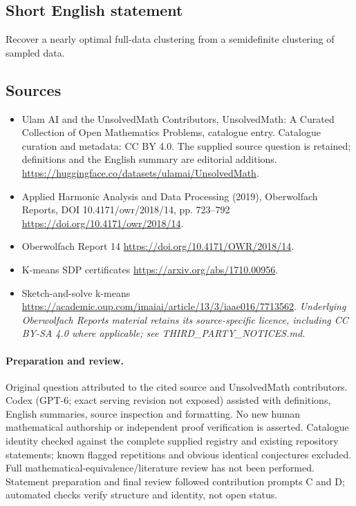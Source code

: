 \documentclass[11pt]{article}
\begin{document}
\subsection{Short English statement}
Recover a nearly optimal full-data clustering from a semidefinite clustering of sampled data.
\subsection{Sources}
\begin{itemize}
\item[\hypertarget{source:statement:1}{S1}] Ulam AI and the UnsolvedMath Contributors, UnsolvedMath: A Curated Collection of Open Mathematics Problems, catalogue entry. Catalogue curation and metadata: CC BY 4.0. The supplied source question is retained; definitions and the English summary are editorial additions.
\url{https://huggingface.co/datasets/ulamai/UnsolvedMath}.
\item[\hypertarget{source:statement:2}{S2}] Applied Harmonic Analysis and Data Processing (2019), Oberwolfach Reports, DOI 10.4171/owr/2018/14, pp. 723--792
\url{https://doi.org/10.4171/owr/2018/14}.
\item[\hypertarget{source:statement:3}{S3}] Oberwolfach Report 14
\url{https://doi.org/10.4171/OWR/2018/14}.
\item[\hypertarget{source:statement:4}{S4}] K-means SDP certificates
\url{https://arxiv.org/abs/1710.00956}.
\item[\hypertarget{source:statement:5}{S5}] Sketch-and-solve k-means
\url{https://academic.oup.com/imaiai/article/13/3/iaae016/7713562}.
\textit{Underlying Oberwolfach Reports material retains its source-specific licence, including CC BY-SA 4.0 where applicable; see THIRD\_PARTY\_NOTICES.md.}
\end{itemize}
\paragraph{Preparation and review.}
Original question attributed to the cited source and UnsolvedMath contributors. Codex (GPT-6; exact serving revision not exposed) assisted with definitions, English summaries, source inspection and formatting. No new human mathematical authorship or independent proof verification is asserted. Catalogue identity checked against the complete supplied registry and existing repository statements; known flagged repetitions and obvious identical conjectures excluded. Full mathematical-equivalence/literature review has not been performed. Statement preparation and final review followed contribution prompts C and D; automated checks verify structure and identity, not open status.
\label{end:statement}
\end{document}
